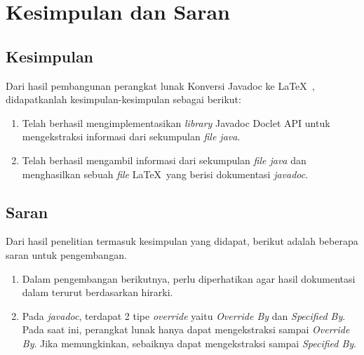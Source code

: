 \chapter{Kesimpulan dan Saran}
\label{sec:kesimpulan dan saran}

\section{Kesimpulan}
\label{sec:kesimpulan}
Dari hasil pembangunan perangkat lunak Konversi Javadoc ke \LaTeX\ , didapatkanlah kesimpulan-kesimpulan sebagai berikut:
\begin{enumerate}
	\item Telah berhasil mengimplementasikan {\it library} Javadoc Doclet API untuk mengekstraksi informasi dari sekumpulan {\it file java}.
	\item Telah berhasil mengambil informasi dari sekumpulan {\it file java} dan menghasilkan sebuah {\it file} \LaTeX\ yang berisi dokumentasi {\it javadoc}.
\end{enumerate}

\section{Saran}
\label{sec:saran}
Dari hasil penelitian termasuk kesimpulan yang didapat, berikut adalah beberapa saran untuk pengembangan.
\begin{enumerate}
	\item Dalam pengembangan berikutnya, perlu diperhatikan agar hasil dokumentasi dalam terurut berdasarkan hirarki.
	\item Pada {\it javadoc}, terdapat 2 tipe {\it override} yaitu {\it Override By} dan {\it Specified By}. Pada saat ini, perangkat lunak hanya dapat mengekstraksi sampai {\it Override By}. Jika memungkinkan, sebaiknya dapat mengekstraksi sampai {\it Specified By}.
\end{enumerate}
